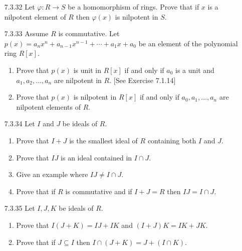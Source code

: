 \begin{enumerate}
   \item[7.3.32]  Let $\varphi : R \rightarrow S$ be a homomorphism of rings.
                  Prove that if $x$ is a nilpotent element of $R$ then
                  $\varphi(x)$ is nilpotent in $S$.
   \item[7.3.33]  Assume $R$ is commutative. Let
                  $p(x) = a_nx^n + a_{n-1}x^{n-1} + \cdots + a_1x + a_0$ be an
                  element of the polynomial ring $R[x]$.
                  \begin{enumerate}
                     \item Prove that $p(x)$ is unit in $R[x]$ if and only if
                           $a_0$ is a unit and $a_1, a_2, \ldots, a_n$ are
                           nilpotent in $R$. [See Exercise 7.1.14]
                     \item Prove that $p(x)$ is nilpotent in $R[x]$ if and only
                           if $a_0, a_1, \ldots, a_n$ are nilpotent elements of
                           $R$.
                  \end{enumerate}
   \item[7.3.34]  Let $I$ and $J$ be ideals of $R$.
                  \begin{enumerate}
                     \item Prove that $I + J$ is the smallest ideal of $R$
                           containing both $I$ and $J$.
                     \item Prove that $IJ$ is an ideal contained in $I \cap J$.
                     \item Give an example where $IJ \neq I \cap J$.
                     \item Prove that if $R$ is commutative and if $I + J = R$
                           then $IJ = I \cap J$.
                  \end{enumerate}
   \item[7.3.35]  Let $I, J, K$ be ideals of $R$.
                  \begin{enumerate}
                     \item Prove that $I(J + K) = IJ + IK$ and
                           $(I + J)K = IK + JK$.
                     \item Prove that if $J \subseteq I$ then
                           $I \cap (J + K) = J + (I \cap K)$.

\end{enumerate}
\end{enumerate}
